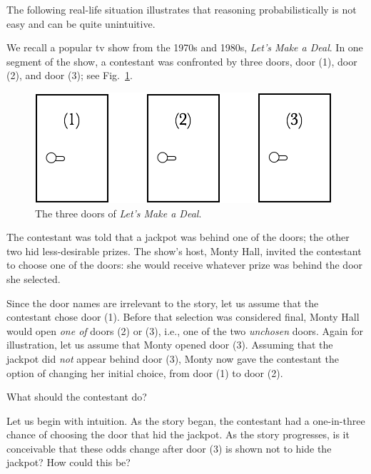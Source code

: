 The following real-life situation illustrates that reasoning
probabilistically is not easy and can be quite unintuitive.

We recall a popular tv show from the 1970s and 1980s, \textit{Let's
  Make a Deal}. In one segment of the show, a
contestant was confronted by three doors, door (1), door (2), and door
(3); see Fig.~\ref{fig:MonthyHal-1}.
\begin{figure}[htb]
\begin{center}
        \includegraphics[scale=0.4]{FiguresMaths/MonthyHallInitial}
        \caption{The three doors of \textit{Let's Make a Deal}.}
        \label{fig:MonthyHal-1}
\end{center}
\end{figure}
The contestant was told that a jackpot was behind one of the doors;
the other two hid less-desirable prizes.  The show's host, Monty Hall,
 invited the contestant to choose one of the doors:
she would receive whatever prize was behind the door she selected.

Since the door names are irrelevant to the story, let us assume that
the contestant chose door (1).  Before that selection was considered
final, Monty Hall would open {\em one of} doors (2) or (3), i.e., one
of the two {\em unchosen} doors.  Again for illustration, let us
assume that Monty opened door (3).  Assuming that the jackpot did {\em
  not} appear behind door (3), Monty now gave the contestant the
option of changing her initial choice, from door (1) to door (2).

What should the contestant do?  

Let us begin with intuition.  As the story began, the contestant had a
one-in-three chance of choosing the door that hid the jackpot.  As the
story progresses, is it conceivable that these odds change after door
(3) is shown not to hide the jackpot?  How could this be?


